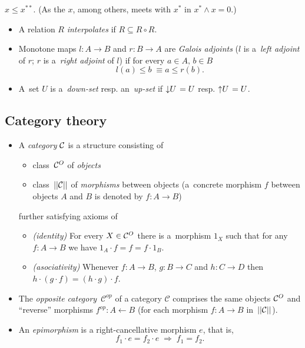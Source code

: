 \begin{fact}
  $x \le x^{**}$.
  (As the $x$, among others, meets with $x^*$ in $x^* \wedge x = 0$.)
\end{fact}

\begin{itemize}
\item A relation $R$ \emph{interpolates} if $R \subseteq R \circ R$.

\item Monotone maps $l\colon A \to B$ and $r\colon B \to A$ are \emph{Galois
  adjoints\/} ($l$ is a~\emph{left adjoint\/} of $r$; $r$ is a~\emph{right
  adjoint\/} of $l$) if for every $a\in A, \, b\in B$
  \[
    l(a) \le b \; \equiv a \le r(b).
  \]

\item A~set $U$ is a~\emph{down-set\/} resp. an~\emph{up-set\/} if
$\left\downarrow U \right. = U$ resp. $\left\uparrow U \right. = U$.
\end{itemize}

\subsection*{Category theory}

\begin{itemize}
\item A \emph{category} $\mathcal{C}$ is a structure consisting of
  \begin{itemize}
  \item class~$\mathcal{C}^O$ of \emph{objects\/}
  \item class~$||\mathcal{C}||$ of \emph{morphisms\/} between objects 
  (a~concrete morphism $f$ between objects $A$ and $B$ is denoted by $f\colon A
   \to B$)
  \end{itemize}
further satisfying axioms of
  \begin{itemize}
  \item \emph{(identity)\/}
  For every $X\in \mathcal{C}^O$ there is a~morphism $1_X$ such that for any $f\colon A \to B$
  we have $1_A \cdot f = f = f \cdot 1_B$.
  \item \emph{(asociativity)\/}
  Whenever $f\colon A \to B$, $g\colon B \to C$ and $h\colon C \to D$ then $h
  \cdot (g \cdot f) = (h \cdot g) \cdot f$.
  \end{itemize}

\item The \emph{opposite category}~$\mathcal{C}^{op}$ of a category
$\mathcal{C}$ comprises the same objects $\mathcal{C}^O$ and ``reverse'' morphisms
$f^{op}\colon A \leftarrow B$ (for each morphism $f\colon A \to B$
in~$||\mathcal{C}||$).

\item An \emph{epimorphism} is a right-cancellative morphism $e$, that is,
\[
  f_1 \cdot e = f_2 \cdot e \; \Longrightarrow \; f_1 = f_2.
\]
\end{itemize}

